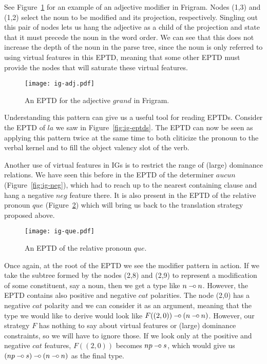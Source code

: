 See Figure~\ref{fig:ig-adj} for an example of an adjective modifier in
Frigram. Nodes (1,3) and (1,2) select the noun to be modified and its
projection, respectively. Singling out this pair of nodes lets us hang
the adjective as a child of the projection and state that it must
precede the noun in the word order. We can see that this does not
increase the depth of the noun in the parse tree, since the noun is only
referred to using virtual features in this EPTD, meaning that some other
EPTD must provide the nodes that will saturate these virtual features.

\begin{figure}
  \centering
  \texttt{[image: ig-adj.pdf]}
  \caption{\label{fig:ig-adj} An EPTD for the adjective $grand$ in
    Frigram.}
\end{figure}

Understanding this pattern can give us a useful tool for reading
EPTDs. Consider the EPTD of $la$ we saw in
Figure~\ref{fig:ig-eptds}. The EPTD can now be seen as applying this
pattern twice at the same time to both cliticize the pronoun to the
verbal kernel and to fill the object valency slot of the
verb.

Another use of virtual features in IGs is to restrict the range of
(large) dominance relations. We have seen this before in the EPTD of the
determiner $aucun$ (Figure~\ref{fig:ig-neg}), which had to reach up to
the nearest containing clause and hang a negative $neg$ feature there.
It is also present in the EPTD of the relative pronoun $que$
(Figure~\ref{fig:ig-que}) which will bring us back to the translation
strategy proposed above.

\begin{figure}
  \centering
  \texttt{[image: ig-que.pdf]}
  \caption{\label{fig:ig-que} An EPTD of the relative pronoun $que$.}
\end{figure}

Once again, at the root of the EPTD we see the modifier pattern in
action. If we take the subtree formed by the nodes (2,8) and (2,9) to
represent a modification of some constituent, say a noun, then we get a
type like $n \mathbin{{-}\mkern-3.5mu{\circ}} n$. However, the EPTD contains also positive and
negative $cat$ polarities. The node (2,0) has a negative $cat$ polarity
and we can consider it as an argument, meaning that the type we would
like to derive would look like $F((2,0)) \mathbin{{-}\mkern-3.5mu{\circ}} (n \mathbin{{-}\mkern-3.5mu{\circ}} n)$. However,
our strategy $F$ has nothing to say about virtual features or (large)
dominance constraints, so we will have to ignore those. If we look only
at the positive and negative $cat$ features, $F((2,0))$ becomes $np
\mathbin{{-}\mkern-3.5mu{\circ}} s$, which would give us $(np \mathbin{{-}\mkern-3.5mu{\circ}} s) \mathbin{{-}\mkern-3.5mu{\circ}} (n \mathbin{{-}\mkern-3.5mu{\circ}} n)$ as the
final type.

